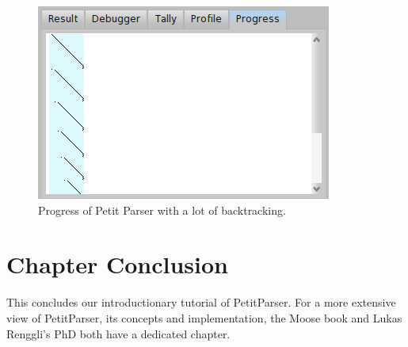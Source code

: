 \documentclass[a4paper,10pt,twoside]{book}
\begin{document}
\begin{description}
\begin{figure}
  \begin{center}
    \includegraphics[scale=0.5]{PPBrowserProgressBacktracking}
    \caption{Progress of Petit Parser with a lot of backtracking. \label{fig:pp/progressBacktracking}}
  \end{center}
\end{figure}

\end{description}

\section{Chapter Conclusion}

This concludes our introductionary tutorial of PetitParser. For a more 
extensive view of PetitParser, its concepts and implementation, the Moose 
book\footnotemark{} and Lukas Renggli's PhD\footnotemark{} both have a dedicated 
chapter.


\ifx\wholebook\relax\else

\label{cha:glamour}


\end{document}
